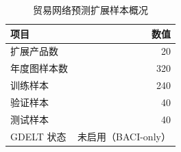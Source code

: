 \begin{table}[H]
  \centering
  \caption{贸易网络预测扩展样本概况}
  \label{tab:v03-overview}
  \begin{tabular}{lr}
    \toprule
    项目 & 数值 \\
    \midrule
    扩展产品数 & 20 \\
    年度图样本数 & 320 \\
    训练样本 & 240 \\
    验证样本 & 40 \\
    测试样本 & 40 \\
    GDELT 状态 & 未启用（BACI-only） \\
    \bottomrule
  \end{tabular}
\end{table}
